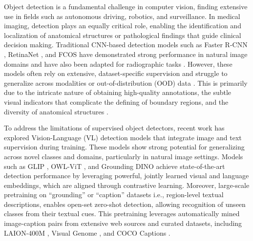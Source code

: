 \documentclass[runningheads]{llncs}
\begin{document}
Object detection is a fundamental challenge in computer vision, finding extensive use in fields such as autonomous driving, robotics, and surveillance. In medical imaging, detection plays an equally critical role, enabling the identification and localization of anatomical structures or pathological findings that guide clinical decision making. Traditional CNN-based detection models such as Faster R-CNN \cite{fasterrcnn}, RetinaNet \cite{li2019light}, and FCOS \cite{tian2020fcos} have demonstrated strong performance in natural image domains and have also been adapted for radiographic tasks \cite{ghosh2024mammo}. However, these models often rely on extensive, dataset-specific supervision and struggle to generalize across modalities or out-of-distribution (OOD) data \cite{emdetr}. This is primarily due to the intricate nature of obtaining high-quality annotations, the subtle visual indicators that complicate the defining of boundary regions, and the diversity of anatomical structures \cite{nguyen2022vindr,rueckel2021pneumothorax}.

To address the limitations of supervised object detectors, recent work has explored Vision-Language (VL) detection models \cite{li2022grounded,liu2024grounding,kim2023region,minderer2023scaling,minderer2022simple} that integrate image and text supervision during training. These models show strong potential for generalizing across novel classes and domains, particularly in natural image settings. Models such as GLIP \cite{li2022grounded}, OWL-ViT \cite{minderer2022simple}, and Grounding DINO \cite{liu2024grounding} achieve state-of-the-art detection performance by leveraging powerful, jointly learned visual and language embeddings, which are aligned through contrastive learning. Moreover, large-scale pretraining on “grounding” or “caption” datasets i.e., region-level textual descriptions, enables open-set zero-shot detection, allowing recognition of unseen classes from their textual cues. This pretraining leverages automatically mined image-caption pairs from extensive web sources and curated datasets, including LAION-400M \cite{schuhmann2021laion}, Visual Genome \cite{krishna2017visual}, and COCO Captions \cite{chen2015microsoft}. 
\end{document}
